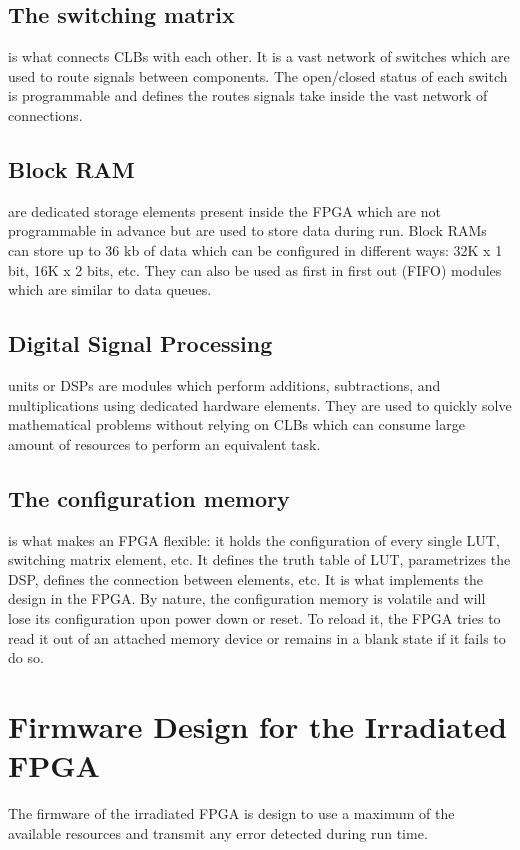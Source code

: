     \subsection{The switching matrix} is what connects CLBs with each other. It is a vast network of switches which are used to route signals between components. The open/closed status of each switch is programmable and defines the routes signals take inside the vast network of connections.

    \subsection{Block RAM} are dedicated storage elements present inside the FPGA which are not programmable in advance but are used to store data during run. Block RAMs can store up to 36 kb of data which can be configured in different ways: 32K x 1 bit, 16K x 2 bits, etc. They can also be used as first in first out (FIFO) modules which are similar to data queues.

    \subsection{Digital Signal Processing} units or DSPs are modules which perform additions, subtractions, and multiplications using dedicated hardware elements. They are used to quickly solve mathematical problems without relying on CLBs which can consume large amount of resources to perform an equivalent task.

    \subsection{The configuration memory} is what makes an FPGA flexible: it holds the configuration of every single LUT, switching matrix element, etc. It defines the truth table of LUT, parametrizes the DSP, defines the connection between elements, etc. It is what implements the design in the FPGA. By nature, the configuration memory is volatile and will lose its configuration upon power down or reset. To reload it, the FPGA tries to read it out of an attached memory device or remains in a blank state if it fails to do so.

  \section{Firmware Design for the Irradiated FPGA}

    The firmware of the irradiated FPGA is design to use a maximum of the available resources and transmit any error detected during run time.


